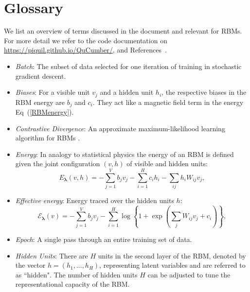 \documentclass[submission, Phys]{SciPost}
\begin{document}
\appendix
\section{Glossary}
\label{Glossary}

We list an overview of terms discussed in the document and relevant for RBMs. For more detail we refer to the code documentation on \url{https://piquil.github.io/QuCumber/}, and References~\cite{hinton2002training, hinton2012practical}.

\begin{itemize}

	\item {\it Batch}: The subset of data selected for one iteration of training in stochastic gradient descent.

	\item {\it Biases}: For a visible unit $v_j$ and a hidden unit $h_i$, the respective biases in the RBM energy are $b_j$ and $c_i$. They act like a magnetic field term in the energy Eq~(\ref{RBMenergy}).

	\item {\it Contrastive Divergence}: An approximate maximum-likelihood learning algorithm for RBMs \cite{hinton2002training}.

	\item {\it Energy}: In analogy to statistical physics the energy of an RBM is defined given the joint configuration $(v,h)$ of visible and hidden units:
	      \begin{equation}
		      E_{\bm{\lambda}}(v,h) = - \sum\limits_{j=1}^V b_j v_j - \sum\limits_{i=1}^H c_i h_i - \sum\limits_{ij} h_i W_{ij} v_j, \label{RBMenergy}
	      \end{equation}

	\item {\it Effective energy}: Energy traced over the hidden units $h$:
	      \begin{equation}
		      \mathcal{E}_{\bm{\lambda}}(v) = - \sum\limits_{j=1}^V b_j v_j - \sum\limits_{i=1}^H \log \left\{ 1 + \exp \left( \sum\limits_{j} W_{ij}v_j +c_i\right) \right\}, \label{RBMeffectiveenergy}
	      \end{equation}

	\item {\it Epoch}: A single pass through an entire training set of data.

	\item {\it Hidden Units}: There are $H$ units in the second layer of the RBM, denoted by the vector $h=(h_1, ..., h_H)$, representing latent variables and are referred to as ``hidden". The number of hidden units $H$ can be adjusted to tune the representational capacity of the RBM.


\end{itemize}
\end{document}
